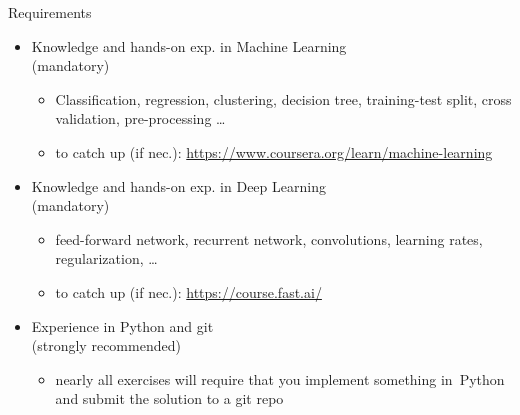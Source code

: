 % 
\begin{frame}[c]{Requirements}

\begin{itemize}
  \item Knowledge and hands-on exp. in \alert{Machine Learning}\\ (mandatory)
  \begin{itemize}
    \item Classification, regression, clustering, decision tree, training-test split, cross validation, pre-processing \ldots
    \item to catch up (if nec.): \url{https://www.coursera.org/learn/machine-learning} 
  \end{itemize}
  \pause
  \item Knowledge and hands-on exp. in \alert{Deep Learning}\\ (mandatory)
  \begin{itemize}
    \item feed-forward network, recurrent network, convolutions, learning rates, regularization, \ldots 
    \item to catch up (if nec.): \url{https://course.fast.ai/}
  \end{itemize}
  \pause
  \item Experience in \alert{Python and git}\\ (strongly recommended)
  \begin{itemize}
    \item nearly all exercises will require 
    that you implement something in~Python and submit the solution to a git repo
  \end{itemize}
\end{itemize}

\end{frame}
